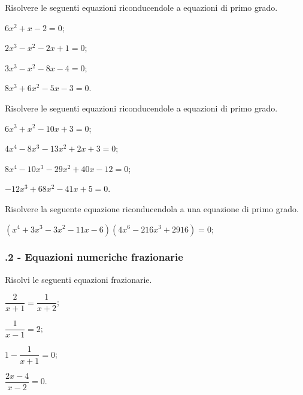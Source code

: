 \begin{esercizio}[\Ast]
\label{ese:20.12}
Risolvere le seguenti equazioni riconducendole a equazioni di primo grado.
\begin{multicols}{2}
\begin{enumeratea}
 \item $6x^{2}+x-2=0$;
 \item $2x^{3}-x^{2}-2x+1=0$;
 \item $3x^{3}-x^{2}-8x-4=0$;
 \item $8x^{3}+6x^{2}-5x-3=0$.
\end{enumeratea}
\end{multicols}
\end{esercizio}

\begin{esercizio}[\Ast]
\label{ese:20.13}
Risolvere le seguenti equazioni riconducendole a equazioni di primo grado.
\begin{multicols}{2}
\begin{enumeratea}
 \item $6x^{3}+x^{2}-10x+3=0$;
 \item $4x^{4}-8x^{3}-13x^{2}+2x+3=0$;
 \item $8x^{4}-10x^{3}-29x^{2}+40x-12=0$;
 \item $-12x^{3}+68x^{2}-41x+5=0$.
\end{enumeratea}
\end{multicols}
\end{esercizio}

\begin{esercizio}[\Ast]
\label{ese:20.14}
Risolvere la seguente equazione riconducendola a una equazione di primo grado.

$(x^{4}+3x^{3}-3x^{2}-11x-6)(4x^{6}-216x^{3}+2916)=0$;
\end{esercizio}

\subsubsection*{\thechapter.2 - Equazioni numeriche frazionarie}

\begin{esercizio}[\Ast]
\label{ese:20.15}
Risolvi le seguenti equazioni frazionarie.
\begin{multicols}{2}
\begin{enumeratea}
 \item $\dfrac{2}{x+1}=\dfrac{1}{x+2}$;
 \item $\dfrac{1}{x-1}=2$;
 \item $1-\dfrac{1}{x+1}=0$;
 \item $\dfrac{2x-4}{x-2}=0$.
\end{enumeratea}
\end{multicols}
\end{esercizio}

